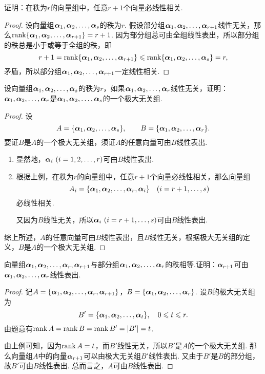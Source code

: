 \begin{example}
证明：在秩为\(r\)的向量组中，任意\(r+1\)个向量必线性相关.
\begin{proof}
\def\a#1{\mat{\alpha}_{#1}}
设向量组\(\a1,\a2,\dotsc,\a s\)的秩为\(r\).
假设部分组\(\a1,\a2,\dotsc,\a{r+1}\)线性无关，那么\(\rank\{\a1,\a2,\dotsc,\a{r+1}\} = r+1\).
因为部分组总可由全组线性表出，所以部分组的秩总是小于或等于全组的秩，即\[
r+1 = \rank\{\a1,\a2,\dotsc,\a{r+1}\} \leqslant \rank\{\a1,\a2,\dotsc,\a s\} = r,
\]矛盾，所以部分组\(\a1,\a2,\dotsc,\a{r+1}\)一定线性相关.
\end{proof}
\end{example}

\begin{example}
\def\a#1{\mat{\alpha}_{#1}}
设向量组\(\a1,\a2,\dotsc,\a s\)的秩为\(r\)，如果\(\a1,\a2,\dotsc,\a r\)线性无关，证明：\(\a1,\a2,\dotsc,\a r\)是\(\a1,\a2,\dotsc,\a s\)的一个极大无关组.
\begin{proof}
设\[
A=\{\a1,\a2,\dotsc,\a s\},
\qquad
B=\{\a1,\a2,\dotsc,\a r\}.
\]要证\(B\)是\(A\)的一个极大无关组，须证\(A\)的任意向量可由\(B\)线性表出.

\begin{enumerate}
\item 显然地，\(\a i\ (i=1,2,\dotsc,r)\)可由\(B\)线性表出.

\item 根据上例，在秩为\(r\)的向量组中，任意\(r+1\)个向量必线性相关，那么向量组\[
A_i = \{\a1,\a2,\dotsc,\a r,\a i\}\quad(i=r+1,\dotsc,s)
\]必线性相关.

又因为\(B\)线性无关，所以\(\a i\ (i=r+1,\dotsc,s)\)可由\(B\)线性表出.
\end{enumerate}

综上所述，\(A\)的任意向量可由\(B\)线性表出，且\(B\)线性无关，根据极大无关组的定义，\(B\)是\(A\)的一个极大无关组.
\end{proof}
\end{example}

\begin{example}
\def\a#1{\mat{\alpha}_{#1}}
向量组\(\a1,\a2,\dotsc,\a r,\a{r+1}\)与部分组\(\a1,\a2,\dotsc,\a r\)的秩相等.证明：\(\a{r+1}\)可由\(\a1,\a2,\dotsc,\a r\)线性表出.
\begin{proof}
记\(A=\{\a1,\a2,\dotsc,\a r,\a{r+1}\}\)，\(B=\{\a1,\a2,\dotsc,\a r\}\).
设\(B\)的极大无关组为\[
B'=\{\a1,\a2,\dotsc,\a t\},
\quad 0 \leqslant t \leqslant r.
\]由题意有\(\rank A = \rank B = \rank B' = \abs{B'} = t\).

由上例可知，因为\(\rank A = t\)，而\(B'\)线性无关，所以\(B'\)是\(A\)的一个极大无关组.
那么向量组\(A\)中的向量\(\a{r+1}\)可以由极大无关组\(B'\)线性表出.
又由于\(B'\)是\(B\)的部分组，故\(B'\)可由\(B\)线性表出.
总而言之，\(A\)可由\(B\)线性表出.
\end{proof}
\end{example}

